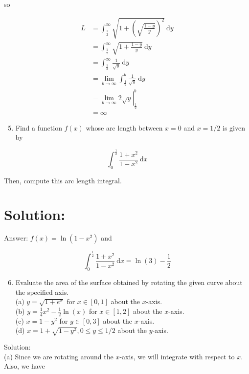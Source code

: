 \documentclass[10pt]{article}
\begin{document}
so

$$
\begin{aligned}
L & =\int_{\frac{1}{2}}^{\infty} \sqrt{1+\left(\sqrt{\frac{1-y}{y}}\right)^{2}} \mathrm{~d} y \\
& =\int_{\frac{1}{2}}^{\infty} \sqrt{1+\frac{1-y}{y}} \mathrm{~d} y \\
& =\int_{\frac{1}{2}}^{\infty} \frac{1}{\sqrt{y}} \mathrm{~d} y \\
& =\lim _{b \rightarrow \infty} \int_{\frac{1}{2}}^{b} \frac{1}{\sqrt{y}} \mathrm{~d} y \\
& =\left.\lim _{b \rightarrow \infty} 2 \sqrt{y}\right|_{\frac{1}{2}} ^{b} \\
& =\infty
\end{aligned}
$$

\begin{enumerate}
  \setcounter{enumi}{4}
  \item Find a function $f(x)$ whose arc length between $x=0$ and $x=1 / 2$ is given by
\end{enumerate}

$$
\int_{0}^{\frac{1}{2}} \frac{1+x^{2}}{1-x^{2}} \mathrm{~d} x
$$

Then, compute this arc length integral.

\section*{Solution:}
Answer: $f(x)=\ln \left(1-x^{2}\right)$ and

$$
\int_{0}^{\frac{1}{2}} \frac{1+x^{2}}{1-x^{2}} \mathrm{~d} x=\ln (3)-\frac{1}{2}
$$

\begin{enumerate}
  \setcounter{enumi}{5}
  \item Evaluate the area of the surface obtained by rotating the given curve about the specified axis.\\
(a) $y=\sqrt{1+e^{x}}$ for $x \in[0,1]$ about the $x$-axis.\\
(b) $y=\frac{1}{4} x^{2}-\frac{1}{2} \ln (x)$ for $x \in[1,2]$ about the $x$-axis.\\
(c) $x=1-y^{2}$ for $y \in[0,3]$ about the $x$-axis.\\
(d) $x=1+\sqrt{1-y^{2}}, 0 \leq y \leq 1 / 2$ about the $y$-axis.
\end{enumerate}

Solution:\\
(a) Since we are rotating around the $x$-axis, we will integrate with respect to $x$. Also, we have
\end{document}
